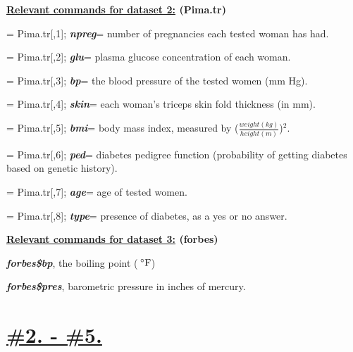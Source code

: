 \documentclass[12pt,a4paper]{article}
\begin{document}
\newpage
\begin{center}{\textbf{\underline{Relevant commands for dataset 2:} (Pima.tr)}}\end{center}
\begin{description}
\footnotesize
\item[\textit{npreg}]= Pima.tr[,1]; \textbf{\textit{npreg}}= number of pregnancies each tested woman has had.
\item[\textit{glu}]= Pima.tr[,2]; \textbf{\textit{glu}}= plasma glucose concentration of each woman.
\item[\textit{bp}]= Pima.tr[,3]; \textbf{\textit{bp}}= the blood pressure of the tested women (mm Hg).
\item[\textit{skin}]= Pima.tr[,4]; \textbf{\textit{skin}}= each woman's triceps skin fold thickness (in mm).
\item[\textit{bmi}]= Pima.tr[,5]; \textbf{\textit{bmi}}= body mass index, measured by {\color{MidnightBlue}($\frac{weight(kg)}{height(m)}$)\begin{math}^2\end{math}}.
\item[\textit{ped}]= Pima.tr[,6]; \textbf{\textit{ped}}= diabetes pedigree function (probability of getting diabetes based on genetic history).
\item[\textit{age}]= Pima.tr[,7]; \textbf{\textit{age}}= age of tested women.
\item[\textit{type}]= Pima.tr[,8]; \textbf{\textit{type}}= presence of diabetes, as a yes or no answer.
\end{description}
\vspace{1cm}
\begin{center}{\textbf{\underline{Relevant commands for dataset 3:} (forbes)}}\end{center}
\begin{description}
\footnotesize
\item[-] \textbf{\textit{forbes\$bp}}, the boiling point ({$\,^{\circ}\rm{F}$})
\item[-] \textbf{\textit{forbes\$pres}}, barometric pressure in inches of mercury.
\end{description}
\newpage
\tableofcontents
\label{label:BTP}
\newpage
\section*{\textbf{\underline{\#2. - \#5.}}}
\end{document}
